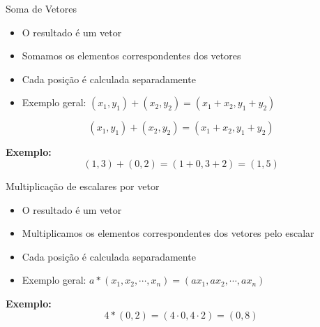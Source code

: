 \documentclass{beamer}
\begin{document}
\begin{frame}{Soma de Vetores}


\vspace{0.5cm}

\begin{itemize}
    \item O resultado é um vetor
    \item Somamos os elementos correspondentes dos vetores
    \item Cada posição é calculada separadamente
    \item Exemplo geral: $(x_1, y_1) + (x_2, y_2) = (x_1 + x_2, y_1 + y_2)$
\end{itemize}

\vspace{0.5cm}

\[
(x_1, y_1) + (x_2, y_2) = (x_1 + x_2, y_1 + y_2)
\]

\vspace{0.5cm}

\textbf{Exemplo:}
\[
(1,3) + (0,2) = (1+0, 3+2) = (1,5)
\]

\end{frame}
\begin{frame}{Multiplicação de escalares por vetor}


\vspace{0.5cm}

\begin{itemize}
    \item O resultado é um vetor
    \item Multiplicamos os elementos correspondentes dos vetores pelo escalar
    \item Cada posição é calculada separadamente
    \item Exemplo geral: $a * (x_1, x_2, \cdots,x_n)  = (ax_1, ax_2, \cdots,ax_n)$
\end{itemize}

\vspace{0.5cm}

\textbf{Exemplo:}
\[
4 * (0,2) = (4 \cdot 0, 4 \cdot 2) = (0,8)
\]

\end{frame}
\end{document}
